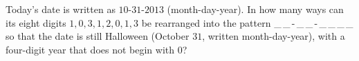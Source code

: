 Today's date is written as $10$-$31$-$2013$ (month-day-year). In how many ways can its eight digits $1,0,3,1,2,0,1,3$ be rearranged into the pattern \_\,\_\,-\,\_\,\_\,-\,\_\,\_\,\_\,\_ so that the date is still Halloween (October $31$, written month-day-year), with a four-digit year that does not begin with $0$?

